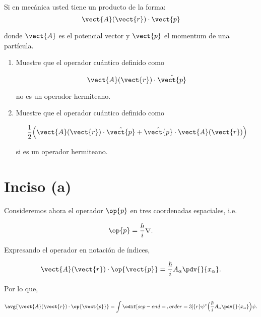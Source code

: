 \documentclass[../main.tex]{subfiles}
\begin{document}
\begin{problema}[20]
	Si en mecánica usted tiene un producto de la forma:
	\begin{equation*}
		\vect{A}(\vect{r})\cdot \vect{p}
	\end{equation*}

	donde \(\vect{A}\) es el potencial vector y \(\vect{p}\) el
	momentum de una partícula.

	\begin{enumerate}
		\item Muestre que el operador cuántico definido como

		      \begin{equation*}
			      \vect{A}(\vect{r})\cdot \hat{\vect{p}}
		      \end{equation*}

		      no es un operador hermiteano.
		\item Muestre que el operador cuántico definido como

		      \begin{equation*}
			      \dfrac{1}{2}\Bigl(\vect{A}(\vect{r})\cdot \hat{\vect{p}} + \hat{\vect{p}}\cdot \vect{A}(\vect{r})\Bigr)
		      \end{equation*}

		      si es un operador hermiteano.
	\end{enumerate}

	\startsolution

	\section{Inciso (a)}

	Consideremos ahora el operador \(\op{p}\) en tres coordenadas espaciales, i.e.

	\begin{equation*}
		\op{p} = \dfrac{\hbar}{i}\nabla.
	\end{equation*}

	Expresando el operador en notación de índices,

	\begin{equation*}
		\vect{A}(\vect{r}) \cdot \op{\vect{p}} = \dfrac{\hbar}{i}A_{\alpha}\pdv{}{x_{\alpha}}.
	\end{equation*}

	Por lo que,

	\begin{equation}
		\avg{\vect{A}(\vect{r}) \cdot \op{\vect{p}}} = \int \odif[sep-end=\medspace, order = 3]{r} \psi^{*}\Bigl(\dfrac{\hbar}{i}A_{\alpha}\pdv{}{x_{\alpha}}\Bigr)\psi.
	\end{equation}


\end{problema}
\end{document}
